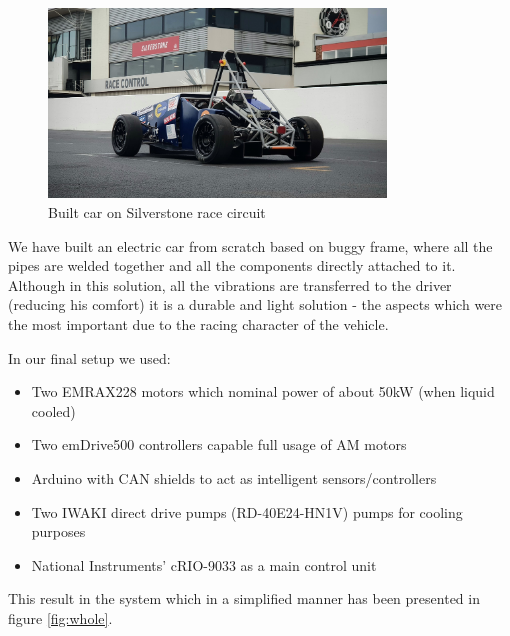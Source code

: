 \begin{figure}[b]
    \centering
        \includegraphics[width=0.8\textwidth]{figures/silverstone.jpg}
        \caption{Built car on Silverstone race circuit}
        \label{pic:silverstone}
\end{figure}


We  have built an electric car from scratch based on buggy frame, where all the pipes are welded together and all the components directly attached to it. Although in this solution, all the vibrations are transferred to the driver (reducing his comfort) it is a durable and light solution - the aspects which were the most important due to the racing character of the vehicle. 

In our final setup we used:
\begin{itemize}
    \item Two EMRAX228 motors which nominal power of about 50kW (when liquid cooled)
    \item Two emDrive500 controllers capable full usage of AM motors
    \item Arduino with CAN shields to act as intelligent sensors/controllers
    \item Two IWAKI direct drive pumps (RD-40E24-HN1V) pumps for cooling purposes
    \item National Instruments' cRIO-9033 as a main control unit
\end{itemize}

This result in the system which in a simplified manner has been presented in figure \ref{fig:whole}.

